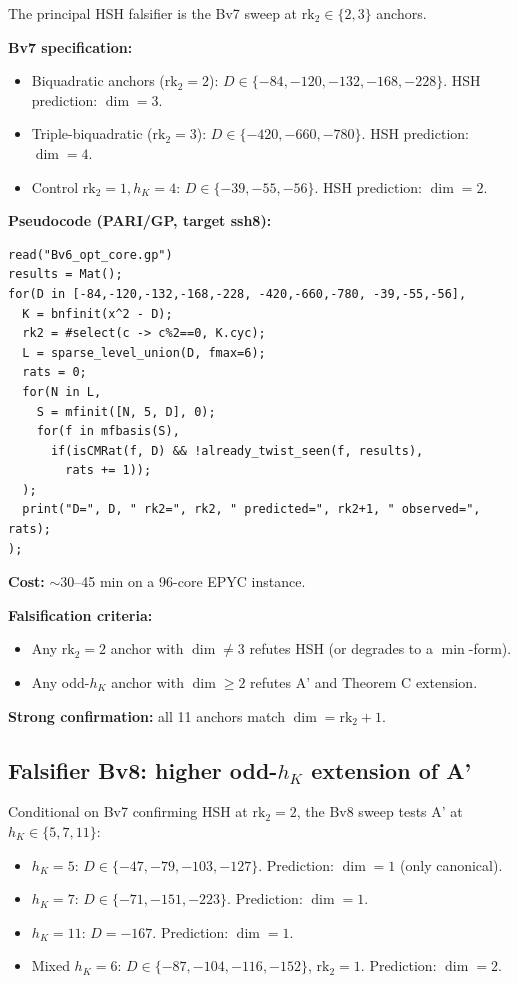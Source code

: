 \documentclass[11pt,a4paper]{amsart}
\theoremstyle{definition}
\newcommand{\hK}{h_{K}}
\newcommand{\rktwo}{\mathrm{rk}_2}
\begin{document}
The principal HSH falsifier is the Bv7 sweep at $\rktwo \in \{2, 3\}$ anchors.

\textbf{Bv7 specification:}
\begin{itemize}[leftmargin=2em]
  \item Biquadratic anchors ($\rktwo = 2$): $D \in \{-84, -120, -132, -168, -228\}$. HSH prediction: $\dim = 3$.
  \item Triple-biquadratic ($\rktwo = 3$): $D \in \{-420, -660, -780\}$. HSH prediction: $\dim = 4$.
  \item Control $\rktwo = 1, \hK = 4$: $D \in \{-39, -55, -56\}$. HSH prediction: $\dim = 2$.
\end{itemize}

\textbf{Pseudocode (PARI/GP, target ssh8):}
\begin{verbatim}
read("Bv6_opt_core.gp")
results = Mat();
for(D in [-84,-120,-132,-168,-228, -420,-660,-780, -39,-55,-56],
  K = bnfinit(x^2 - D);
  rk2 = #select(c -> c%2==0, K.cyc);
  L = sparse_level_union(D, fmax=6);
  rats = 0;
  for(N in L,
    S = mfinit([N, 5, D], 0);
    for(f in mfbasis(S),
      if(isCMRat(f, D) && !already_twist_seen(f, results),
        rats += 1));
  );
  print("D=", D, " rk2=", rk2, " predicted=", rk2+1, " observed=", rats);
);
\end{verbatim}

\textbf{Cost:} $\sim$30--45 min on a 96-core EPYC instance.

\textbf{Falsification criteria:}
\begin{itemize}[leftmargin=2em]
  \item Any $\rktwo = 2$ anchor with $\dim \ne 3$ refutes HSH (or degrades to a $\min$-form).
  \item Any odd-$\hK$ anchor with $\dim \ge 2$ refutes A' and Theorem C extension.
\end{itemize}

\textbf{Strong confirmation:} all 11 anchors match $\dim = \rktwo + 1$.

\subsection{Falsifier Bv8: higher odd-$\hK$ extension of A'}\label{sec:falsifier-Bv8}

Conditional on Bv7 confirming HSH at $\rktwo = 2$, the Bv8 sweep tests A' at $\hK \in \{5, 7, 11\}$:
\begin{itemize}[leftmargin=2em]
  \item $\hK = 5$: $D \in \{-47, -79, -103, -127\}$. Prediction: $\dim = 1$ (only canonical).
  \item $\hK = 7$: $D \in \{-71, -151, -223\}$. Prediction: $\dim = 1$.
  \item $\hK = 11$: $D = -167$. Prediction: $\dim = 1$.
  \item Mixed $\hK = 6$: $D \in \{-87, -104, -116, -152\}$, $\rktwo = 1$. Prediction: $\dim = 2$.
\end{itemize}
\end{document}
